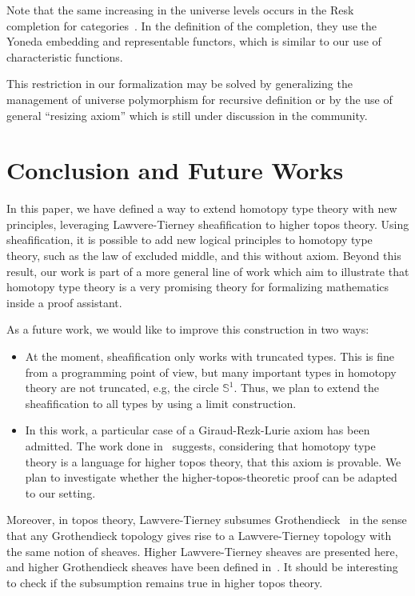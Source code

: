 \documentclass[conference]{IEEEtran}
\newcommand{\eg}{e.g,\xspace}
\begin{document}
Note that the same increasing in the universe levels occurs in the
Resk completion for categories~\cite{resk}. In the definition of the
completion, they use the Yoneda embedding and representable functors,
which is similar to our use of characteristic functions.
 
%
This restriction in our formalization may be solved by
generalizing the management of universe polymorphism for recursive definition
%
or by the use of general ``resizing axiom'' which is still under
discussion in the community.

\section{Conclusion and Future Works}
\label{sec:future-works}

In this paper, we have defined a way to extend homotopy type theory
with new principles, leveraging Lawvere-Tierney sheafification to
higher topos theory. 
%
Using sheafification, it is possible to add new logical principles to
homotopy type theory, such as the law of excluded middle, and this
without axiom.
%
Beyond this result, our work is part of a more general line of work
which aim to illustrate that homotopy type theory is a very promising
theory for formalizing mathematics inside a proof assistant.


As a future work, we would like to improve this construction in two
ways:
\begin{itemize}
\item 
  At the moment, sheafification only works with truncated
  types. This is fine from a programming point of view, 
  but many important types in homotopy theory are not
  truncated, \eg the circle $\mathbb S^1$.  Thus, we plan to extend
  the sheafification to all types by using a
  limit construction.
\item 
  In this work, a particular case of a Giraud-Rezk-Lurie axiom has
  been admitted. The work done in~\cite[Chapter 6]{lurie} suggests,
  considering that homotopy type theory is a language for higher topos
  theory, that this axiom is provable. We plan to investigate whether the
  higher-topos-theoretic proof can be adapted to our setting.
\end{itemize}
Moreover, in topos theory, Lawvere-Tierney subsumes Grothendieck~\cite[Section~V.4]{maclanemoerdijk} in the sense that any
Grothendieck topology gives rise to a Lawvere-Tierney topology with
the same notion of sheaves. Higher Lawvere-Tierney sheaves are
presented here, and higher Grothendieck sheaves have been defined
in~\cite{lurie}. It should be interesting to check if the subsumption
remains true in higher topos theory.
\end{document}
